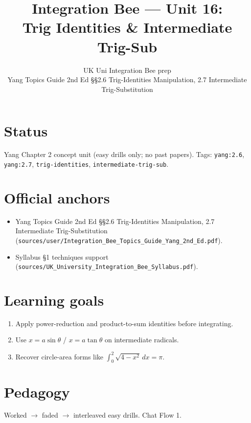 
\title{Integration Bee --- Unit 16:\\ Trig Identities \& Intermediate Trig-Sub}
\author{UK Uni Integration Bee prep\\ Yang Topics Guide 2nd Ed §§2.6 Trig-Identities Manipulation, 2.7 Intermediate Trig-Substitution}
\date{}

\maketitle

\section*{Status}
Yang Chapter 2 concept unit (easy drills only; no past papers).
Tags: \texttt{yang:2.6}, \texttt{yang:2.7}, \texttt{trig-identities}, \texttt{intermediate-trig-sub}.

\section{Official anchors}
\begin{itemize}
  \item Yang Topics Guide 2nd Ed §§2.6 Trig-Identities Manipulation, 2.7 Intermediate Trig-Substitution
        (\texttt{sources/user/Integration\_Bee\_Topics\_Guide\_Yang\_2nd\_Ed.pdf}).
  \item Syllabus §1 techniques support
        (\texttt{sources/UK\_University\_Integration\_Bee\_Syllabus.pdf}).
\end{itemize}

\section{Learning goals}
\begin{enumerate}
  \item Apply power-reduction and product-to-sum identities before integrating.
  \item Use $x=a\sin\theta$ / $x=a\tan\theta$ on intermediate radicals.
  \item Recover circle-area forms like $\int_{0}^{2}\sqrt{4-x^{2}}\,dx=\pi$.
\end{enumerate}

\section{Pedagogy}
Worked $\to$ faded $\to$ interleaved easy drills. Chat Flow 1.


